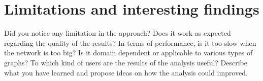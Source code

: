 \documentclass[11pt,a4paper,onecolumn,notitlepage]{article}
\begin{document}
\section{Limitations and interesting findings}

Did you notice any limitation in the approach? Does it work as expected regarding the quality of the results? In terms of performance, is it too slow when the network is too big? Is it domain dependent or applicable to various types of graphs? To which kind of users are the results of the analysis useful? Describe what you have learned and propose ideas on how the analysis could improved. 




  
\end{document}
